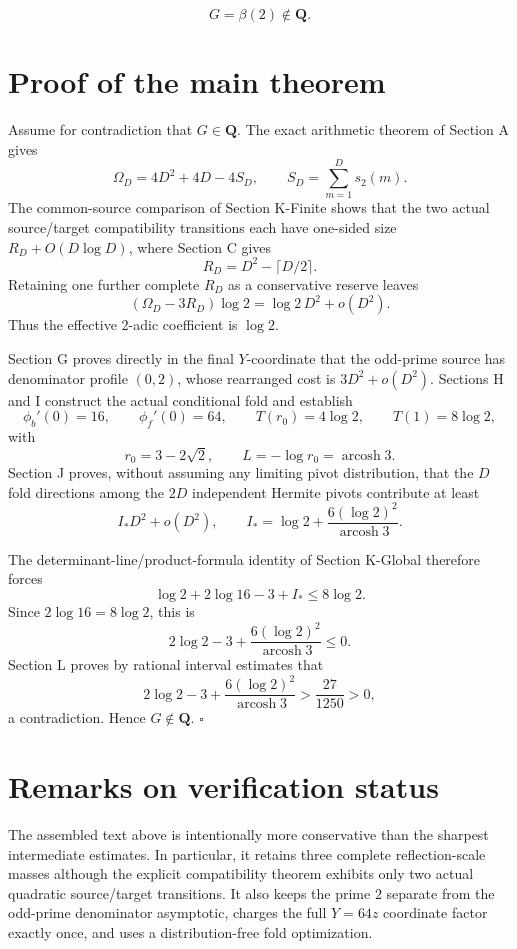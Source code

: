 \documentclass[
  10pt,
  letterpaper,
]{article}
\theoremstyle{definition}
\theoremstyle{remark}
\begin{document}
\[
\boxed{G=\beta(2)\notin\mathbf Q.}
\]

\section{Proof of the main theorem}\label{proof-of-the-main-theorem}

Assume for contradiction that \(G\in\mathbf Q\). The exact arithmetic
theorem of Section A gives \[
\Omega_D=4D^2+4D-4S_D,
\qquad
S_D=\sum_{m=1}^D s_2(m).
\] The common-source comparison of Section K-Finite shows that the two
actual source/target compatibility transitions each have one-sided size
\(R_D+O(D\log D)\), where Section C gives \[
R_D=D^2-\lceil D/2\rceil.
\] Retaining one further complete \(R_D\) as a conservative reserve
leaves \[
(\Omega_D-3R_D)\log2
=\log2\,D^2+o(D^2).
\] Thus the effective \(2\)-adic coefficient is \(\log2\).

Section G proves directly in the final \(Y\)-coordinate that the
odd-prime source has denominator profile \((0,2)\), whose rearranged
cost is \(3D^2+o(D^2)\). Sections H and I construct the actual
conditional fold and establish \[
\phi_b'(0)=16,
\qquad
\phi_f'(0)=64,
\qquad
T(r_0)=4\log2,
\qquad
T(1)=8\log2,
\] with \[
r_0=3-2\sqrt2,
\qquad
L=-\log r_0=\operatorname{arcosh}3.
\] Section J proves, without assuming any limiting pivot distribution,
that the \(D\) fold directions among the \(2D\) independent Hermite
pivots contribute at least \[
I_*D^2+o(D^2),
\qquad
I_*=\log2+\frac{6(\log2)^2}{\operatorname{arcosh}3}.
\]

The determinant-line/product-formula identity of Section K-Global
therefore forces \[
\log2+2\log16-3+I_*\le8\log2.
\] Since \(2\log16=8\log2\), this is \[
2\log2-3+\frac{6(\log2)^2}{\operatorname{arcosh}3}\le0.
\] Section L proves by rational interval estimates that \[
2\log2-3+\frac{6(\log2)^2}{\operatorname{arcosh}3}
>\frac{27}{1250}>0,
\] a contradiction. Hence \(G\notin\mathbf Q\). \(\square\)

\section{Remarks on verification
status}\label{remarks-on-verification-status}

The assembled text above is intentionally more conservative than the
sharpest intermediate estimates. In particular, it retains three
complete reflection-scale masses although the explicit compatibility
theorem exhibits only two actual quadratic source/target transitions. It
also keeps the prime \(2\) separate from the odd-prime denominator
asymptotic, charges the full \(Y=64z\) coordinate factor exactly once,
and uses a distribution-free fold optimization.
\end{document}
